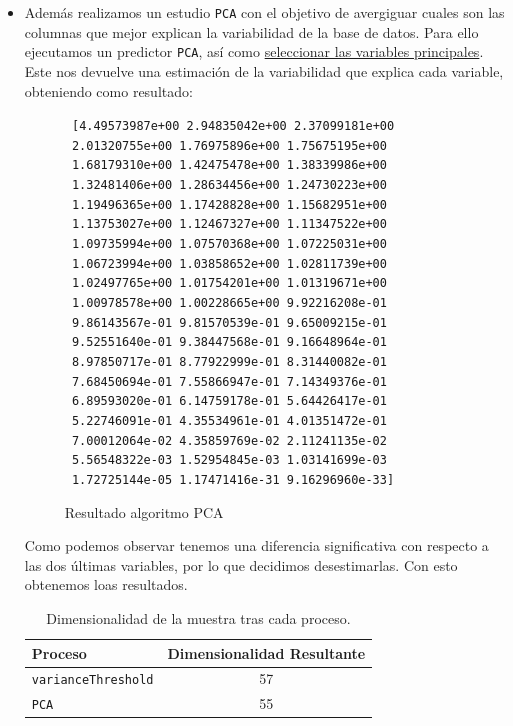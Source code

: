 \documentclass[11pt,a4paper]{article}
\begin{document}
\begin{itemize}
\begin{itemize}
\item Además realizamos un estudio \texttt{PCA} con el objetivo de avergiguar cuales son las columnas que mejor explican la variabilidad de la base de datos. Para ello ejecutamos un predictor \texttt{PCA}, así como \underline{seleccionar las variables principales}. Este nos devuelve una estimación de la variabilidad que explica cada variable, obteniendo como resultado:
\begin{figure}[h]
{\center
\texttt{
[4.49573987e+00 2.94835042e+00 2.37099181e+00 \\
\ 2.01320755e+00 1.76975896e+00 1.75675195e+00 \\
\ 1.68179310e+00 1.42475478e+00 1.38339986e+00\\
\ 1.32481406e+00 1.28634456e+00 1.24730223e+00\\
\ 1.19496365e+00 1.17428828e+00 1.15682951e+00\\
\ 1.13753027e+00 1.12467327e+00 1.11347522e+00\\
\ 1.09735994e+00 1.07570368e+00 1.07225031e+00\\
\ 1.06723994e+00 1.03858652e+00 1.02811739e+00\\
\ 1.02497765e+00 1.01754201e+00 1.01319671e+00\\
\ 1.00978578e+00 1.00228665e+00 9.92216208e-01\\
\ 9.86143567e-01 9.81570539e-01 9.65009215e-01\\
\ 9.52551640e-01 9.38447568e-01 9.16648964e-01\\
\ 8.97850717e-01 8.77922999e-01 8.31440082e-01\\
\ 7.68450694e-01 7.55866947e-01 7.14349376e-01\\
\ 6.89593020e-01 6.14759178e-01 5.64426417e-01\\
\ 5.22746091e-01 4.35534961e-01 4.01351472e-01\\
\ 7.00012064e-02 4.35859769e-02 2.11241135e-02\\
\ 5.56548322e-03 1.52954845e-03 1.03141699e-03\\
\ 1.72725144e-05 1.17471416e-31 9.16296960e-33]\\}
}
\caption{Resultado algoritmo PCA}
\end{figure}

Como podemos observar tenemos una diferencia significativa con respecto a las dos últimas variables, por lo que decidimos desestimarlas. Con esto obtenemos loas resultados.

		
\begin{table}[h]
\begin{center}
\begin{tabular}{|l|c|}
\hline
 Proceso & Dimensionalidad Resultante \\ \hline
  \texttt{varianceThreshold} &57 \\
\texttt{PCA} &55 \\\hline
\end{tabular}
\end{center}
\caption{Dimensionalidad de la muestra tras cada proceso.}
	\end{table}


\end{itemize}
\end{itemize}
\end{document}
